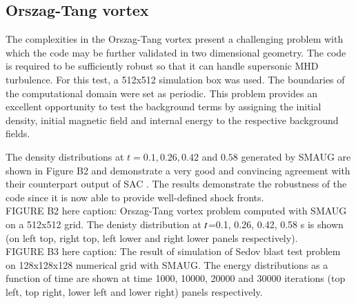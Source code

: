 \documentclass[final,1p]{elsarticle}
\begin{document}
\subsection{Orszag-Tang vortex}
The complexities in the Orszag-Tang vortex \cite{Orszag1979} present a challenging problem with which the code may be further validated in two dimensional geometry. The code is required to be sufficiently robust so that it can handle supersonic MHD turbulence. For this test, a 512x512 simulation box was used. The boundaries of the computational  domain were set as periodic. This problem provides an excellent opportunity to test the background terms by assigning the initial density, initial magnetic field and internal energy to the respective background fields.

The density distributions at $t=0.1, 0.26, 0.42$ and $0.58$   generated by SMAUG are shown in Figure B2 and demonstrate a very good and convincing agreement with their counterpart output of SAC \cite{Shelyag2008}. The results demonstrate the robustness of the code since it is now able to provide well-defined shock fronts.\\ 


FIGURE B2 here caption: Orszag-Tang vortex problem computed with SMAUG on a 512x512 grid. The denisty distribution at $\it t$=0.1, 0.26, 0.42, 0.58 s is shown (on left top, right top, left lower and right lower panels respectively).\\



FIGURE B3 here caption: The result of simulation of Sedov blast test problem on 128x128x128 numerical grid with SMAUG. The energy distributions as a function of time are shown at time 1000, 10000, 20000 and 30000 iterations (top left, top right, lower left and lower right) panels respectively.\\



\end{document}
